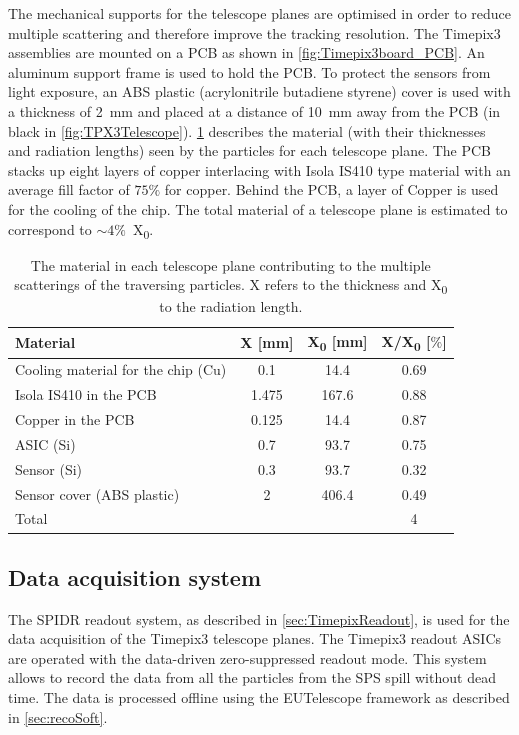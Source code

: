 The mechanical supports for the telescope planes are optimised in
order to reduce multiple scattering and therefore improve the tracking
resolution. The Timepix3 assemblies are mounted on a PCB as shown in
\cref{fig:Timepix3board_PCB}. An aluminum support frame is used to
hold the PCB. To protect the sensors from light exposure, an ABS
plastic (acrylonitrile butadiene styrene) cover is used with a
thickness of 2~mm and placed at a distance of 10~mm away from the PCB
(in black in
\cref{fig:TPX3Telescope}). \cref{tab:TPX3TelescopeMaterial} describes
the material (with their thicknesses and radiation lengths) seen by
the particles for each telescope plane. The PCB stacks up eight layers
of copper interlacing with Isola IS410 type material with an average
fill factor of $75\%$ for copper. Behind the PCB, a layer of Copper is
used for the cooling of the chip. The total material of a telescope
plane is estimated to correspond to $\sim4\%$~X\textsubscript{0}.

\begin{table}[htbp]
  \centering
  \caption{The material in each telescope plane contributing to the
    multiple scatterings of the traversing particles. X refers to the thickness and X\textsubscript{0} to the radiation
    length.}
  \label{tab:TPX3TelescopeMaterial}
  \begin{tabular}{l c c c}
    \toprule
    Material & X [mm] & X\textsubscript{0} [mm] & X/X\textsubscript{0} [$\%$] \\
    \midrule
    Cooling material for the chip (Cu) & 0.1 & 14.4 & 0.69 \\
    Isola IS410 in the PCB & 1.475 & 167.6 & 0.88 \\
    Copper in the PCB & 0.125 & 14.4 & 0.87 \\
    ASIC (Si) & 0.7 & 93.7 & 0.75\\
    Sensor (Si) & 0.3 & 93.7 & 0.32\\ 
    Sensor cover (ABS plastic) & 2 & 406.4 & 0.49 \\ \hline
    Total & & & 4 \\
    \bottomrule
  \end{tabular}
\end{table}

\subsection{Data acquisition system}
The SPIDR readout system, as described in \cref{sec:TimepixReadout},
is used for the data acquisition of the Timepix3 telescope planes. The
Timepix3 readout ASICs are operated with the data-driven
zero-suppressed readout mode. This system allows to record the data
from all the particles from the SPS spill without dead time. The data
is processed offline using the EUTelescope framework as described in
\cref{sec:recoSoft}.


